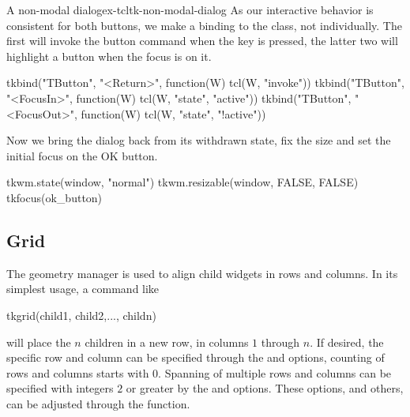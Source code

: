 \begin{example}{A non-modal dialog}{ex-tcltk-non-modal-dialog}
As our interactive behavior is consistent for both buttons, we make a
binding to the  class, not individually. The first will
invoke the button command when the  key is pressed, the
latter two will highlight a button when the focus is on it.
\begin{Schunk}
\begin{Sinput}
 tkbind("TButton", "<Return>", function(W) tcl(W, "invoke"))
 tkbind("TButton", "<FocusIn>", function(W) 
        tcl(W, "state", "active"))
 tkbind("TButton", "<FocusOut>", function(W) 
        tcl(W, "state", "!active"))
\end{Sinput}
\end{Schunk}
%
Now we bring the dialog back from its withdrawn state, fix the size
and set the initial focus on the OK button.
\begin{Schunk}
\begin{Sinput}
 tkwm.state(window, "normal")
 tkwm.resizable(window, FALSE, FALSE)
 tkfocus(ok_button)
\end{Sinput}
\end{Schunk}
\end{example}


\subsection{Grid}
\label{sec:tcltk:grid}
The  geometry manager is used to align child widgets
in rows and columns.  In its simplest usage, a command like
\begin{Schunk}
  \begin{Sinput}
tkgrid(child1, child2,..., childn)    
  \end{Sinput}
\end{Schunk}
will place the $n$ children in a new row, in columns $1$ through
$n$. If desired, the specific row and column can be specified through the
 and  options, counting of
rows and columns starts with $0$.  Spanning of multiple rows and columns
can be specified with integers $2$ or greater by the
 and  options. These
options, and others, can be adjusted through the
 function.


